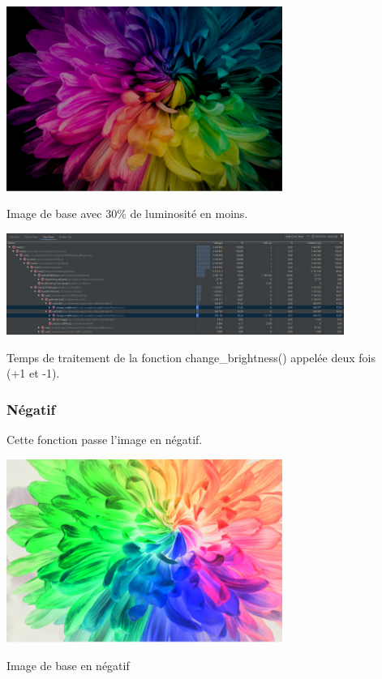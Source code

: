 \documentclass{article}
\begin{document}
\begin{center} 
    \includegraphics[width=9cm]{../Image_fonctions/LuminositeMoins3}

    Image de base avec 30\% de luminosité en moins.
\end{center}
\bigbreak

\begin{center} 
    \includegraphics[width=11cm]{../Image_temps/TempsChangeBrightness}

    Temps de traitement de la fonction change\_brightness() appelée deux fois\\(+1 et -1).
\end{center}
\bigbreak

\subsubsection{Négatif}
Cette fonction passe l'image en négatif.
\bigbreak

\begin{center} 
    \includegraphics[width=9cm]{../Image_fonctions/Negatif}

    Image de base en négatif
\end{center}
\end{document}
